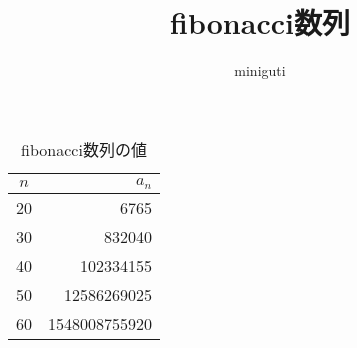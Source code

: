 \documentclass{jarticle}
\begin{document}
\title{fibonacci数列}
\author{miniguti}
\maketitle


\begin{table}
 \begin{center}
  \caption{fibonacci数列の値}
  \begin{tabular}{|c|r|}
   \hline
   $n$ & $a_n$    \\ 
   \hline \hline
   20 & 6765 \\
   \hline
   30 & 832040 \\
   \hline
   40 & 102334155 \\
   \hline
   50 & 12586269025 \\
   \hline
   60 & 1548008755920 \\
   \hline
  \end{tabular}
 \end{center}
\end{table}
\end{document}
